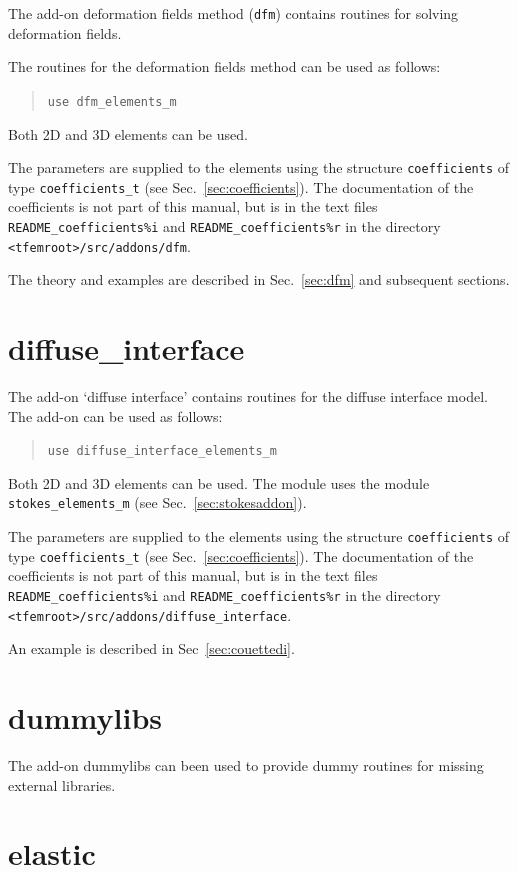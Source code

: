 The add-on deformation fields method (\texttt{dfm}) contains routines for solving
deformation fields.

The routines for the deformation fields method can be used as follows:
\begin{quote}
   \texttt{use dfm\_elements\_m}
\end{quote}
Both 2D and 3D elements can be used.

The parameters are
supplied to the elements using the structure \texttt{coefficients} of type
\texttt{coefficients\_t} (see Sec.~\ref{sec:coefficients}). The documentation
of the coefficients is not part of this manual, but is in the text files
\texttt{README\_coefficients\%i} and
\texttt{README\_coefficients\%r} in the directory
\texttt{<tfemroot>/src/addons/dfm}.

The theory and examples are described in
Sec.~\ref{sec:dfm} and subsequent sections.

\section{diffuse\_interface}
\label{sec:diffuse_interface}

The add-on `diffuse interface' contains routines for the diffuse interface
model.
The add-on can be used as follows:
\begin{quote}
   \texttt{use diffuse\_interface\_elements\_m}
\end{quote}
Both 2D and 3D elements can be used.
The module uses the module \texttt{stokes\_elements\_m}
 (see Sec.~\ref{sec:stokesaddon}).

The parameters are
supplied to the elements using the structure \texttt{coefficients} of type
\texttt{coefficients\_t} (see Sec.~\ref{sec:coefficients}). The documentation
of the coefficients is not part of this manual, but is in the text files
\texttt{README\_coefficients\%i} and
\texttt{README\_coefficients\%r} in the directory
\texttt{<tfemroot>/src/addons/diffuse\_interface}.

An example is described in Sec~\ref{sec:couettedi}.

\section{dummylibs}
\label{sec:dummylibs}

The add-on dummylibs can been used to provide dummy routines for missing
external libraries.

\section{elastic}
\label{sec:elastic}

